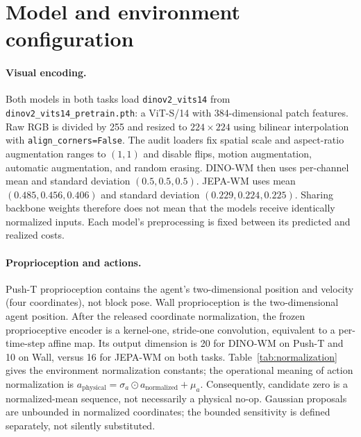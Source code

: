\documentclass{article}
\begin{document}
\section{Model and environment configuration}
\label{app:config}

\paragraph{Visual encoding.}
Both models in both tasks load \texttt{dinov2\_vits14} from
\texttt{dinov2\_vits14\_pretrain.pth}: a ViT-S/14 with 384-dimensional patch
features. Raw RGB is divided by 255 and resized to $224\times224$ using
bilinear interpolation with \texttt{align\_corners=False}. The audit loaders
fix spatial scale and aspect-ratio augmentation ranges to $(1,1)$ and disable
flips, motion augmentation, automatic augmentation, and random erasing.
DINO-WM then uses per-channel mean and standard deviation $(0.5,0.5,0.5)$.
JEPA-WM uses mean $(0.485,0.456,0.406)$ and standard deviation
$(0.229,0.224,0.225)$. Sharing backbone weights therefore does not mean that
the models receive identically normalized inputs. Each model's preprocessing
is fixed between its predicted and realized costs.

\paragraph{Proprioception and actions.}
Push-T proprioception contains the agent's two-dimensional position and
velocity (four coordinates), not block pose. Wall proprioception is the
two-dimensional agent position. After the released coordinate normalization,
the frozen proprioceptive encoder is a kernel-one, stride-one convolution,
equivalent to a per-time-step affine map. Its output dimension is 20 for
DINO-WM on Push-T and 10 on Wall, versus 16 for JEPA-WM on both tasks.
Table~\ref{tab:normalization} gives the environment normalization constants;
the operational meaning of action normalization is
$a_{\mathrm{physical}}=\sigma_a\odot a_{\mathrm{normalized}}+\mu_a$.
Consequently, candidate zero is a normalized-mean sequence, not necessarily
a physical no-op. Gaussian proposals are unbounded in normalized coordinates;
the bounded sensitivity is defined separately, not silently substituted.
\end{document}
